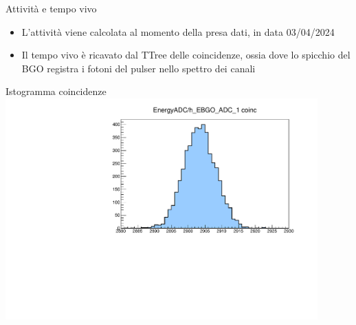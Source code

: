 \documentclass [xcolor=svgnames] {beamer}
\begin{document}
\begin{frame}{Attività e tempo vivo}
	\begin{itemize}
		\item L'attività viene calcolata al momento della presa dati, in data 03/04/2024
		\item Il tempo vivo è ricavato dal TTree delle coincidenze, ossia dove lo spicchio del BGO registra i fotoni del pulser nello spettro dei canali
	\end{itemize}
\end{frame}
\begin{frame}{Istogramma coincidenze}
	\centering
	\includegraphics[width=0.9\textwidth]{img/run1776_coinc_h_EBGO_ADC_1_COINC.pdf}
\end{frame}




\end{document}
